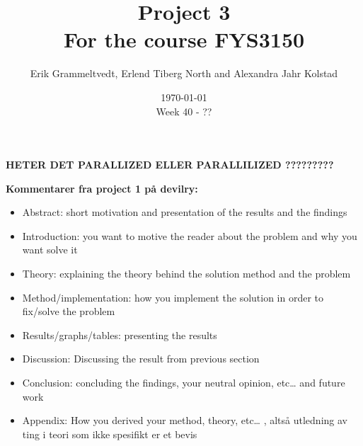 \documentclass{article}
\begin{document}
\addtocounter{page}{0}

\title{Project 3 \\
      \large For the course FYS3150}
\date{\today \\
    \vspace{1mm}
    \large Week 40 - ??}

\author{Erik Grammeltvedt, Erlend Tiberg North and Alexandra Jahr Kolstad}

\maketitle




\newpage
\clearpage

\textbf{\Large HETER DET PARALLIZED ELLER PARALLILIZED ?????????} \\

\vspace{3cm}

\textbf{Kommentarer fra project 1 på devilry:}

\begin{itemize}

\item Abstract: short motivation and presentation of the results and the findings \\

\item Introduction: you want to motive the reader about the problem and why you want solve it \\

\item Theory: explaining the theory behind the solution method and the problem \\

\item Method/implementation: how you implement the solution in order to fix/solve the problem \\

\item Results/graphs/tables: presenting the results \\

\item Discussion: Discussing the result from previous section \\

\item Conclusion: concluding the findings, your neutral opinion, etc… and future work \\

\item Appendix: How you derived your method, theory, etc… , altså utledning av ting i teori som ikke spesifikt er et bevis \\

\end{itemize}
\end{document}

